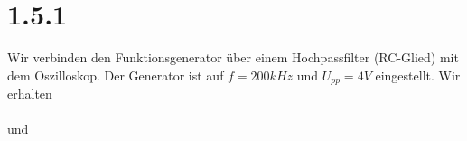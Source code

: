 \documentclass[main.tex]{subfiles}
\begin{document}
\section{1.5.1}
Wir verbinden den Funktionsgenerator über einem Hochpassfilter (RC-Glied) mit dem Oszilloskop. Der Generator ist auf $f = 200 kHz$ und $U_{pp} = 4V $ eingestellt. Wir erhalten \\
\\

und

\\
\end{document}
